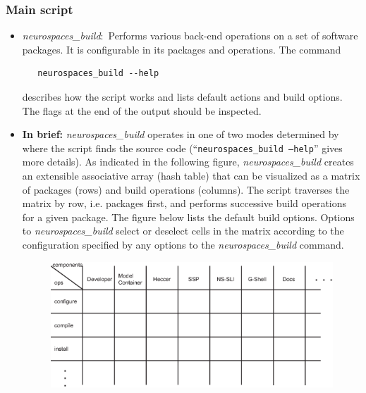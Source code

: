 \documentclass[12pt]{article}
\begin{document}
\subsubsection*{Main script}

\begin{itemize}
   \item {\it neurospaces\_build}:\,\,\,Performs various back-end operations on a set of software packages. It is configurable in its packages and operations. The command
      \begin{verbatim}
   neurospaces_build --help
      \end{verbatim}
describes how the script works and lists default actions and build options. The flags at the end of the output should be inspected.

   \item {\bf In brief:} {\it neurospaces\_build} operates in one of two modes determined by where the script finds the source code (``{\tt neurospaces\_build --help}'' gives more details). As indicated in the following figure, {\it neurospaces\_build} creates an extensible associative array (hash table) that can be visualized as a matrix of packages (rows) and build operations (columns). The script traverses the matrix by row, i.e. packages first, and performs successive build operations for a given package. The figure below  lists the default build options. Options to {\it neurospaces\_build} select or deselect cells in the matrix according to the configuration specified by any options to the {\it neurospaces\_build} command.
   
\begin{figure}[h]
   \centering
   \includegraphics[scale=0.7]{figures/build-matrix.eps}
\end{figure}
   

\end{itemize}
\end{document}
